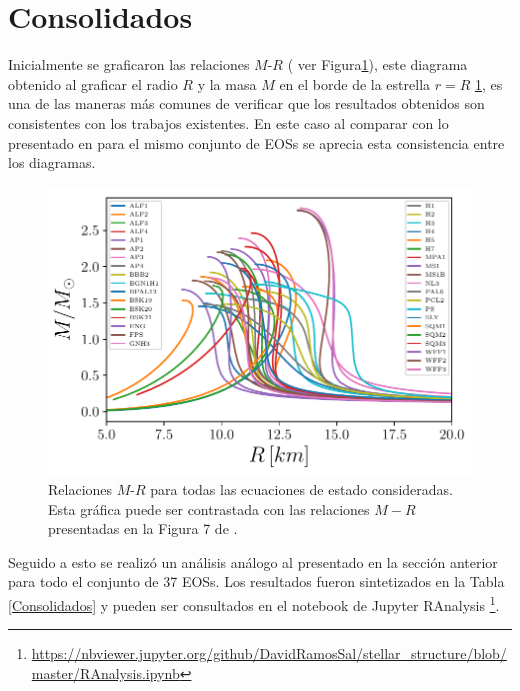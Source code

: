 \section{Consolidados}
\noindent Inicialmente se graficaron las relaciones $M$-$R$ ( ver Figura\ref{MRrel}), este diagrama obtenido al graficar el radio $R$ y la masa $M$ en el borde de la estrella $r=R$ \ref{MRrel}, es una de las maneras más comunes de verificar que los resultados obtenidos son consistentes con los trabajos existentes. En este caso al comparar con lo presentado en \cite{Ozel2016} para el mismo conjunto de EOSs se aprecia esta consistencia entre los diagramas.

\begin{figure}[H]
    \centering
    \includegraphics[width=0.8\linewidth]{figures/MRrels.pdf}
    \caption[Relaciones $M-R$]{Relaciones $M$-$R$ para todas las ecuaciones de estado consideradas. Esta gráfica puede ser contrastada con las relaciones $M-R$ presentadas en la Figura 7 de \cite{Ozel2016}.} 
    \label{MRrel}
\end{figure}

Seguido a esto se realizó un análisis análogo al presentado en la sección anterior para todo el conjunto de 37 EOSs. Los resultados fueron sintetizados en la Tabla \ref{Consolidados} y pueden ser consultados en el notebook de Jupyter RAnalysis \footnote{\url{https://nbviewer.jupyter.org/github/DavidRamosSal/stellar_structure/blob/master/RAnalysis.ipynb}}. 

